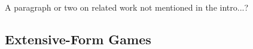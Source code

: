 \documentclass[letterpaper]{article}
\newcounter{vlNoteCounter}
\newcommand{\vlnote}[1]{{\scriptsize \color{blue} $\blacksquare$ \refstepcounter{vlNoteCounter}\textsf{[VL]$_{\arabic{vlNoteCounter}}$:{#1}}}}
\begin{document}

A paragraph or two on related work not mentioned in the intro...?

\subsection{Extensive-Form Games}
\end{document}
